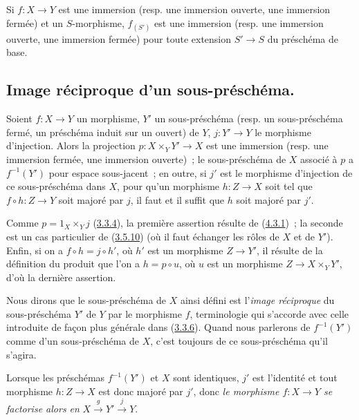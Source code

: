 \begin{corollary}[4.3.2]
\label{I.4.3.2-fr}
Si $f:X\to Y$ est une immersion (\textup{resp.} une immersion ouverte, une immersion
fermée) et un $S$-morphisme, $f_{(S')}$ est une immersion (\textup{resp.} une immersion
ouverte, une immersion fermée) pour toute extension $S'\to S$ du préschéma de
base.
\end{corollary}

\subsection{Image réciproque d'un sous-préschéma.}
\label{subsection:I.4.4-fr}

\begin{proposition}[4.4.1]
\label{I.4.4.1-fr}
Soient $f:X\to Y$ un morphisme, $Y'$ un sous-préschéma (\textup{resp.} un
sous-préschéma fermé, un préschéma induit sur un ouvert) de $Y$, $j:Y'\to Y$
le morphisme d'injection. Alors la projection $p:X\times_Y Y'\to X$ est une
immersion (\textup{resp.} une immersion fermée, une immersion ouverte)~; le
sous-préschéma de $X$ associé à $p$ a $f^{-1}(Y')$ pour espace sous-jacent~;
en outre, si $j'$ est le morphisme d'injection de ce sous-préschéma dans $X$,
pour qu'un morphisme $h:Z\to X$ soit tel que $f\circ h:Z\to Y$ soit majoré
par $j$, il faut et il suffit que $h$ soit majoré par $j'$.
\end{proposition}

Comme $p=1_X\times_Y j$ (\hyperref[I.3.3.4-fr]{3.3.4}), la première assertion
résulte de (\hyperref[I.4.3.1-fr]{4.3.1})~; la seconde est un cas particulier
de (\hyperref[I.3.5.10-fr]{3.5.10}) (où il faut échanger les rôles de $X$ et
de $Y'$). Enfin, si on a $f\circ h=j\circ h'$, où $h'$ est un morphisme
$Z\to Y'$, il résulte de la définition du produit que l'on a $h=p\circ u$,
où $u$ est un morphisme $Z\to X\times_Y Y'$, d'où la dernière assertion.

Nous dirons que le sous-préschéma de $X$ ainsi défini est l'\emph{image
réciproque} du sous-préschéma $Y'$ de $Y$ par le morphisme $f$, terminologie
qui s'accorde avec celle introduite
de façon plus générale dans (\hyperref[I.3.3.6-fr]{3.3.6}). Quand nous
parlerons de $f^{-1}(Y')$ comme d'un sous-préschéma de $X$, c'est toujours de
ce sous-préschéma qu'il s'agira.

Lorsque les préschémas $f^{-1}(Y')$ et $X$ sont identiques, $j'$ est
l'identité et tout morphisme $h:Z\to X$ est donc majoré par $j'$, donc
\emph{le morphisme $f:X\to Y$ se factorise alors en}
$X\xrightarrow{g}Y'\xrightarrow{j}Y$.

